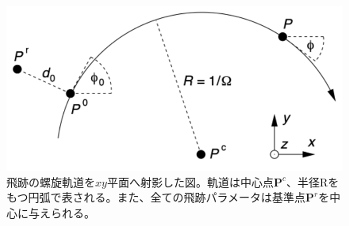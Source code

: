 \begin{figure}[H]
	\begin{center}
 \includegraphics[keepaspectratio, scale=0.4]
 	{Figure/Appendix/xy.png}
 		\caption[飛跡の$xy$平面への射影]{飛跡の螺旋軌道を$xy$平面へ射影した図。軌道は中心点$\mathbf{P}^c$、半径Rをもつ円弧で表される。また、全ての飛跡パラメータは基準点$\mathbf{P}^r$を中心に与えられる。}
 		\label{xy}
	\end{center}
\end{figure}

